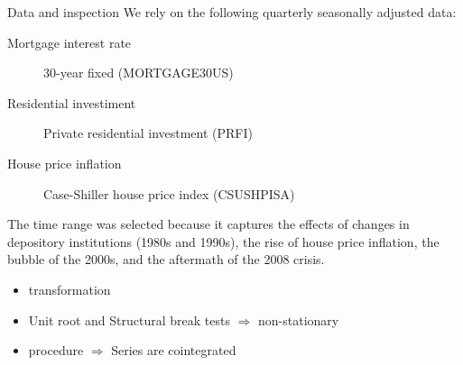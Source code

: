 \documentclass[10pt]{beamer}
\begin{document}
\begin{frame}[label={sec:orgcea4c2b}]{Data and inspection}
\label{DataInspection}
We rely on the following quarterly seasonally adjusted data:
\begin{description}
\item[{Mortgage interest rate}] 30-year fixed (MORTGAGE30US)
\item[{Residential investiment}] Private residential investment (PRFI)
\item[{House price inflation}] Case-Shiller house price index (CSUSHPISA)
\end{description}

The time range was selected because it captures the effects of changes in depository institutions (1980s and 1990s), the rise of house price inflation, the bubble of the 2000s, and the aftermath of the 2008 crisis.

\begin{itemize}
\item \textcite{yeo_new_2000} transformation \hyperlink{YeoTransformation}{}
\item Unit root and Structural break tests \(\Rightarrow\) non-stationary \hyperlink{UnitTest}{}
\item \textcite{johansen_estimation_1991} procedure \(\Rightarrow\) Series are cointegrated \hyperlink{CointTest}{}
\end{itemize}
\end{frame}
\end{document}
